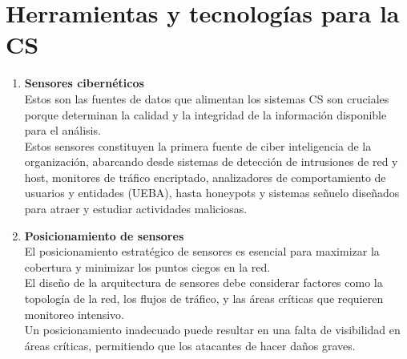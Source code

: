 \section{Herramientas y tecnologías para la CS}
\begin{enumerate}[resume]

\item \textbf{Sensores cibernéticos} \\
Estos son las fuentes de datos que alimentan los sistemas CS son cruciales porque determinan la calidad y la integridad de la información disponible para el análisis.\\
Estos sensores constituyen la primera fuente de ciber inteligencia de la organización, abarcando desde sistemas de detección de intrusiones de red y host, monitores de tráfico encriptado, analizadores de comportamiento de usuarios y entidades (UEBA), hasta honeypots y sistemas señuelo diseñados para atraer y estudiar actividades maliciosas.

\item \textbf{Posicionamiento de sensores} \\
El posicionamiento estratégico de sensores es esencial para maximizar la cobertura y minimizar los puntos ciegos en la red.\\
El diseño de la arquitectura de sensores debe considerar factores como la topología de la red, los flujos de tráfico, y las áreas críticas que requieren monitoreo intensivo.\\
Un posicionamiento inadecuado puede resultar en una falta de visibilidad en áreas críticas, permitiendo que los atacantes de hacer daños graves. 


\end{enumerate}
